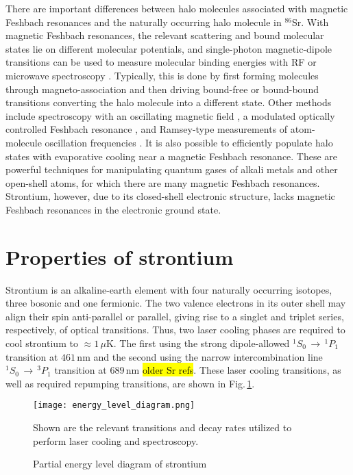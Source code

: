 There are important differences between halo molecules associated with magnetic Feshbach resonances and the naturally occurring halo molecule in $^{86}$Sr. 
With magnetic Feshbach resonances, the relevant scattering and bound molecular states lie on different molecular potentials, and single-photon magnetic-dipole transitions can be used to measure molecular binding energies with RF or microwave spectroscopy \cite{Chin2010,cju05,thw95b}. 
Typically, this is done by first forming molecules through magneto-association and then driving bound-free or bound-bound transitions converting the halo molecule into a different state. 
Other methods include spectroscopy with an oscillating magnetic field \cite{thw95b}, a modulated optically controlled Feshbach resonance \cite{chx15}, and Ramsey-type measurements of atom-molecule oscillation frequencies \cite{ckt03}. 
It is also possible to efficiently populate halo states with evaporative cooling \cite{jba03} near a magnetic Feshbach resonance. 
These are powerful techniques for manipulating quantum gases of alkali metals and other open-shell atoms, for which there are many magnetic Feshbach resonances. 
Strontium, however, due to its closed-shell electronic structure, lacks magnetic Feshbach resonances in the electronic ground state.

\section{Properties of strontium}
\label{sec:sr}
Strontium is an alkaline-earth element with four naturally occurring isotopes, three bosonic and one fermionic.
The two valence electrons in its outer shell may align their spin anti-parallel or parallel, giving rise to a singlet and triplet series, respectively, of optical transitions.
Thus, two laser cooling phases are required to cool strontium to $\approx\!1\,\mu$K.
The first using the strong dipole-allowed $^1S_0\,\rightarrow\,^1P_1$ transition at $461$\,nm and the second using the narrow intercombination line $^1S_0\,\rightarrow\,^3P_1$ transition at $689$\,nm \hl{older Sr refs}.
These laser cooling transitions, as well as required repumping transitions, are shown in Fig.\,\ref{fig:energyLevels}.
	\begin{figure} 
		\centerline{
		\texttt{[image: energy\_level\_diagram.png]}}
		\caption{Partial energy level diagram of strontium}{Shown are the relevant transitions and decay rates utilized to perform laser cooling and spectroscopy.}
		\label{fig:energyLevels}
	\end{figure}
	
